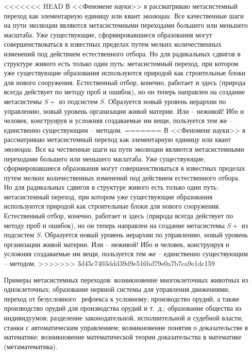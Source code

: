\documentclass{book}
\begin{document}
<<<<<<< HEAD
В <<Феномене науки>> я рассматриваю метасистемный пере­ход как элементарную единицу или квант  \textit{эволюции.} Все ка­чественные 
шаги на пути эволюции являются метасистемными переходами большего или меньшего масштаба. Уже сущест­вующие, сформировавшиеся 
образования могут совершенство­ваться в известных пределах путем мелких количественных изменений под действием естественного 
отбора. Но для ради­кальных сдвигов в структуре живого есть только один путь: метасистемный переход, при котором уже существующие 
образования используются природой как строительные блоки для нового сооружения. Естественный отбор, конечно, работает и здесь 
(природа всегда действует по методу проб и ошибок), но он теперь направлен на создание метасистемы $S+$ из подси­стем $S$. 
Образуется новый уровень иерархии по управлению, новый уровень организации живой материи. Или -- неживой! Ибо и человек, 
конструируя и усложняя создаваемые им вещи, пользуется тем же -- единственно существующим -- методом.
=======
В <<Феномене науки>> я рассматриваю метасистемный пере­ход как элементарную единицу или квант  \textit{эволюции.} Все ка­
чественные шаги на пути эволюции являются метасистемными переходами большего или меньшего масштаба. Уже сущест­вующие, 
сформировавшиеся образования могут совершенство­ваться в известных пределах путем мелких количественных изменений под действием 
естественного отбора. Но для ради­кальных сдвигов в структуре живого есть только один путь: метасистемный переход, при котором 
уже существующие образования используются природой как строительные блоки для нового сооружения. Естественный отбор, конечно, 
работает и здесь (природа всегда действует по методу проб и ошибок), но он теперь направлен на создание метасистемы $S+$ из 
подси­стем $S$. Образуется новый уровень иерархии по управлению, новый уровень организации живой материи. Или -- неживой! Ибо и 
человек, конструируя и усложняя создаваемые им вещи, пользуется тем же -- единственно существующим -- методом.
>>>>>>> 3d45c7403ddd39d9e516bd79e0a7b7ca9e1dc159


Примеры метасистемных переходов: возникновение много­клеточных животных из одноклеточных; образование нерв­ной системы для 
управления движениями; переход от безус­ловного  рефлекса к условному; производство орудий, а также производство орудий для 
производства орудий и т.~д.; образование общества из индивидуумов; разделение законо­дательной, исполнительной и судебной власти; 
станки с авто­матическим управлением; возникновение понятия о доказа­тельстве в математике; возникновение математической теории 
доказательства в математике (метаматематика).
\end{document}
